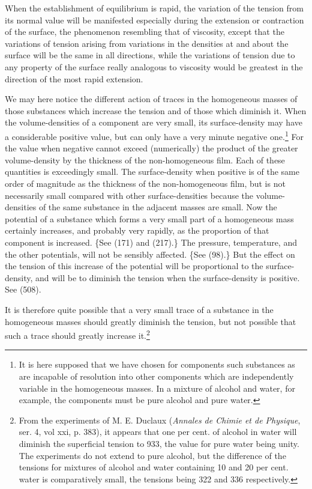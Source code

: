 \documentclass[12pt]{article}
\begin{document}
{When the establishment of equilibrium is rapid, the variation of the tension from its normal value will be manifested especially during the extension or contraction of the surface, the phenomenon resembling that of viscosity, except that the variations of tension arising from variations in the densities at and about the surface will be the same in all directions, while the variations of tension due to any property of the surface really analogous to viscosity would be greatest in the direction of the most rapid extension.

We may here notice the different action of traces in the homogeneous masses of those substances which increase the tension and of those which diminish it. When the volume-densities of a component are very small, its surface-density may have a considerable positive value, but can only have a very minute negative one.\footnote{It is here supposed that we have chosen for components such substances as are incapable of resolution into other components which are independently variable in the homogeneous masses. In a mixture of alcohol and water, for example, the components must be pure alcohol and pure water.} For the value when negative cannot exceed (numerically) the product of the greater volume-density by the thickness of the non-homogeneous film. Each of these quantities is exceedingly small. The surface-density when positive is of the same order of magnitude as the thickness of the non-homogeneous film, but is not necessarily small compared with other surface-densities because the volume-densities of the same substance in the adjacent masses are small. Now the potential of a substance which forms a very small part of a homogeneous mass certainly increases, and probably very rapidly, as the proportion of that component is increased. \{See (171) and (217).\} The pressure, temperature, and the other potentials, will not be sensibly affected.  \{See (98).\}  But the effect on the tension of this increase of the potential will be proportional to the surface-density, and will be to diminish the tension when the surface-density is positive. See (508).} It is therefore quite possible that a very small trace of a substance in the homogeneous masses should greatly diminish the tension, but not possible that such a trace should greatly increase it.\footnote{From the experiments of M. E. Duclaux (\textit{Annales de Chimie et de Physique}, ser. 4, vol xxi, p. 383), it appears that one per cent. of alcohol in water will diminish the superficial tension to 933, the value for pure water being unity. The experiments do not extend to pure alcohol, but the difference of the tensions for mixtures of alcohol and water containing 10 and 20 per cent. water is comparatively small, the tensions being 322 and 336 respectively.\par
}
\end{document}
